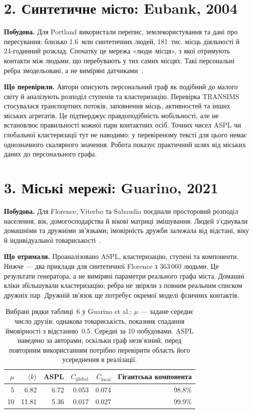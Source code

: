 \documentclass[11pt,a4paper]{article}
\begin{document}
\section*{2. Синтетичне місто: Eubank, 2004}
\textbf{Побудова.} Для Portland використали перепис, землекористування та дані про пересування: близько 1.6~млн синтетичних людей, 181~тис. місць діяльності й 24-годинний розклад. Спочатку це мережа «люди--місця», з якої отримують контакти між людьми, що перебувають у тих самих місцях. Такі персональні ребра змодельовані, а не виміряні датчиками~\cite{eubank}.

\textbf{Що перевірили.} Автори описують персональний граф як подібний до малого світу й аналізують розподіл ступенів та кластеризацію. Перевірка TRANSIMS стосувалася транспортних потоків, заповнення місць, активностей та інших міських агрегатів. Це підтверджує правдоподібність мобільності, але не встановлює правильності кожної пари контактних осіб. Точних чисел ASPL чи глобальної кластеризації тут не наводимо: у перевіреному тексті для цього немає однозначного скалярного значення. Робота показує практичний шлях від міських даних до персонального графа.

\section*{3. Міські мережі: Guarino, 2021}
\textbf{Побудова.} Для Florence, Viterbo та Sabaudia поєднали просторовий розподіл населення, вік, домогосподарства й вікові матриці змішування. Людей з'єднували домашніми та дружніми зв'язками; імовірність дружби залежала від відстані, віку й індивідуальної товариськості~\cite{guarino}.

\textbf{Що отримали.} Проаналізовано ASPL, кластеризацію, ступені та компоненти. Нижче --- два приклади для синтетичної Florence з 363\,060 людьми. Це результати генератора, а не виміряні параметри реального графа міста. Домашні кліки збільшували кластеризацію; ребра не звіряли з повним реальним списком дружніх пар. Дружній зв'язок ще потребує окремої моделі фізичних контактів.

\begin{table}[htbp]
\centering\small
\begin{tabular}{rrrrrr}
\toprule
$\mu$ & $\langle k\rangle$ & ASPL & $C_{\mathrm{global}}$ & $\overline C_{\mathrm{local}}$ & Гігантська компонента\\
\midrule
5 & 6.82 & 6.72 & 0.053 & 0.074 & 98.8\%\\
10 & 11.81 & 5.36 & 0.017 & 0.027 & 99.9\%\\
\bottomrule
\end{tabular}
\caption{Вибрані рядки таблиці~6 у Guarino et al.: $\mu$ --- задане середнє число друзів; однакова товариськість, показник спадання ймовірності з відстанню~0.5. Середні за 10 побудовами. ASPL наведено за авторами; оскільки граф незв'язний, перед повторним використанням потрібно перевірити область його усереднення в реалізації.}
\end{table}
\end{document}
